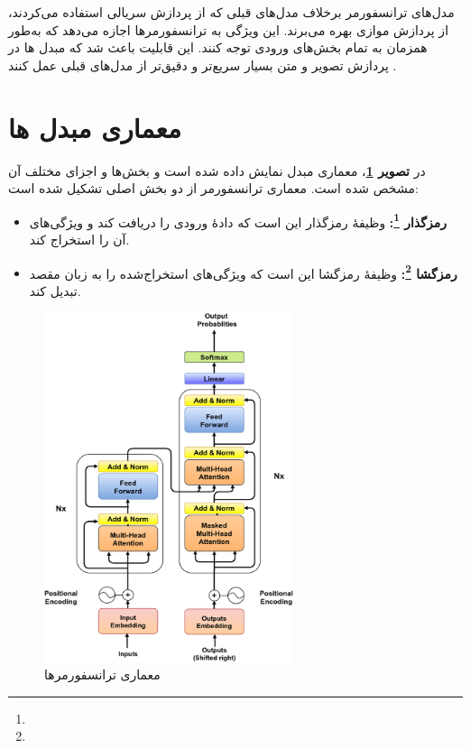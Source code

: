 مدل‌های ترانسفورمر برخلاف مدل‌های قبلی که از پردازش سریالی استفاده می‌کردند، از پردازش موازی بهره می‌برند. این ویژگی به ترانسفورمرها اجازه می‌دهد که به‌طور همزمان به تمام بخش‌های ورودی توجه کنند. این قابلیت باعث شد که مبدل ها در پردازش تصویر و متن بسیار سریع‌تر و دقیق‌تر از مدل‌های قبلی عمل کنند \cite{vaswani2017attention}.

\section{معماری مبدل ها}
در \textbf{تصویر \ref{fig:transformer_architecture}}، معماری مبدل نمایش داده شده است و بخش‌ها و اجزای مختلف آن مشخص شده است. معماری ترانسفورمر از دو بخش اصلی تشکیل شده است:
\begin{itemize}
\item \textbf{رمزگذار \footnote{}:}
وظیفهٔ رمزگذار این است که دادهٔ ورودی را دریافت کند و ویژگی‌های آن را استخراج کند.
\item \textbf{رمزگشا \footnote{}:}
وظیفهٔ رمزگشا این است که ویژگی‌های استخراج‌شده را به زبان مقصد تبدیل کند.
\end{itemize}

\begin{figure}[h]
	\centering
	\includegraphics[width=0.65\textwidth]{Transformer-model-architecture.png}
	\caption{معماری ترانسفورمرها}
	\label{fig:transformer_architecture}
\end{figure}

